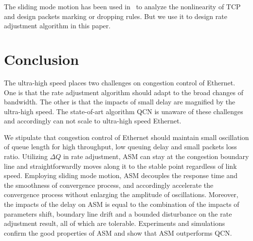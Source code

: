 \documentclass{sig-alternate-10pt}
\begin{document}
The sliding mode motion has been used in~\cite{SMVS, PengYan} to analyze the nonlinearity of TCP and design packets marking or dropping rules. But we use it to design rate adjustment algorithm in this paper. 


\iffalse
\begin{figure}
\centering
\texttt{[image: figure/tcp.eps]}
\caption{Trajectories of Congestion Control Algorithms}
\label{tcp}
\end{figure}

\subsection{Delay}

\subsection{Other Related Work}
ASM is designed using the method of sliding mode control. Previously, this method has been used in~\cite{SMVS, PengYan} to analyze the nonlinearity of TCP and design packets marking or dropping rules. But rate adjustment algorithm is designed in this paper. 
\fi

\section{Conclusion}
The ultra-high speed places two challenges on congestion control of Ethernet. One is that the rate adjustment algorithm should adapt to the broad changes of bandwidth. The other is that the impacts of small delay are magnified by the ultra-high speed. The state-of-art algorithm QCN is unaware of these challenges and accordingly can not scale to ultra-high speed Ethernet. 

We stipulate that congestion control of Ethernet should maintain small oscillation of queue length for high throughput, low queuing delay and small packets loss ratio. Utilizing $\Delta Q$ in rate adjustment, ASM can stay at the congestion boundary line and straightforwardly moves along it to the stable point regardless of link speed. Employing sliding mode motion, ASM decouples the response time and the smoothness of convergence process, and accordingly accelerate the convergence process without enlarging the amplitude of oscillations. Moreover, the impacts of the delay on ASM is equal to the combination of the impacts of parameters shift, boundary line drift and a bounded disturbance on the rate adjustment result, all of which are tolerable. Experiments and simulations confirm the good properties of ASM and show that ASM outperforms QCN. 
\end{document}
